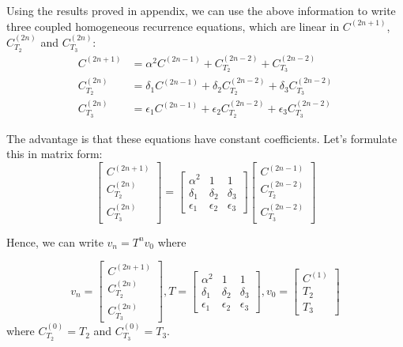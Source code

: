 \documentclass[11pt,a4paper]{article}
\begin{document}
Using the results proved in appendix, we can use the above information to write three coupled homogeneous recurrence equations, which are linear in $C^{(2n+1)}$, $C^{(2n)}_{T_2}$ and $C^{(2n)}_{T_3} $:
\begin{equation}
\boxed{
\begin{aligned}
C^{(2n+1)}&= \alpha^2  C^{(2n-1)} +C^{(2n-2)}_{T_2} + C^{(2n-2)}_{T_3} \\
C^{(2n)}_{T_2} &=\delta_1  C^{(2n-1)} + \delta_2 C^{(2n-2)}_{T_2} + \delta_3 C^{(2n-2)}_{T_3} \\
C^{(2n)}_{T_3} &=\epsilon_1  C^{(2n-1)} + \epsilon_2 C^{(2n-2)}_{T_2} + \epsilon_3  C^{(2n-2)}_{T_3}
\end{aligned}
}
\end{equation}

The advantage is that these equations have constant coefficients. Let's formulate this in matrix form:
\begin{equation}
 \begin{bmatrix}
C^{(2n+1)} \\
C^{(2n)}_{T_2} \\
C^{(2n)}_{T_3}  
   \end{bmatrix}
  = \begin{bmatrix}
    \alpha^2       & 1 &1  \\
    \delta_{1}     & \delta_{2} &  \delta_{3} \\
    \epsilon_{1}   & \epsilon_{2} & \epsilon_{3}
\end{bmatrix}
\begin{bmatrix}
C^{(2n-1)} \\
C^{(2n-2)}_{T_2} \\
C^{(2n-2)}_{T_3}  
   \end{bmatrix}   
\end{equation}

Hence, we can write $v_n= T^n v_0$ where 

\begin{equation}
v_n= \begin{bmatrix}
C^{(2n+1)} \\
C^{(2n)}_{T_2} \\
C^{(2n)}_{T_3}  
   \end{bmatrix},   
T = \begin{bmatrix}
    \alpha^2       & 1 &1  \\
    \delta_{1}     & \delta_{2} &  \delta_{3} \\
    \epsilon_{1}   & \epsilon_{2} & \epsilon_{3}
\end{bmatrix} ,
v_0=\begin{bmatrix}
C^{(1)} \\
T_2 \\
T_3    
   \end{bmatrix}
\end{equation}
where $C^{(0)}_{T_2}= T_2$ and $C^{(0)}_{T_3}= T_3$.
\end{document}

